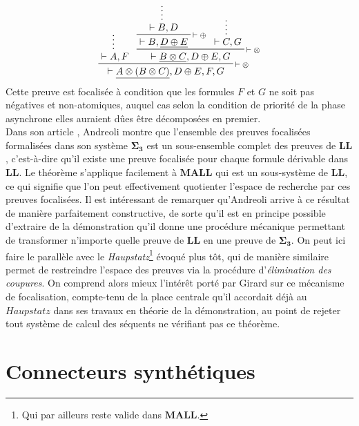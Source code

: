 \documentclass[11pt]{report}
\newcommand{\seq}{\vdash}
\newcommand{\irule}[1]{\footnotesize$#1$}
\newcommand{\iruleR}[1]{\irule{\seq{#1}}}
\begin{document}
\begin{displaymath}
	\prftree[r]{\iruleR{\otimes}}
		{\prfsummary{\seq A,F}}
		{\prftree[r]{\iruleR{\otimes}}
			{\prftree[r]{\iruleR{\oplus}}
				{\prfsummary{\seq B,D}}
				{\seq B,\underline{D \oplus E}}}
			{\prfsummary{\seq C,G}}
			{\seq \underline{B \otimes C},D \oplus E,G}}
	{\seq \underline{A \otimes (B \otimes C)},D \oplus E,F,G}
\end{displaymath}
Cette preuve est focalisée à condition que les formules $F$ et $G$ ne soit pas négatives et non-atomiques, auquel cas selon la condition de priorité de la phase asynchrone elles auraient dûes être décomposées en premier.\\

Dans son article \cite{And92}, Andreoli montre que l'ensemble des preuves focalisées formalisées dans son système $\bm{\Sigma_3}$ est un sous-ensemble complet des preuves de $\mathbf{LL}$, c'est-à-dire qu'il existe une preuve focalisée pour chaque formule dérivable dans $\mathbf{LL}$. Le théorème s'applique facilement à $\mathbf{MALL}$ qui est un sous-système de $\mathbf{LL}$, ce qui signifie que l'on peut effectivement quotienter l'espace de recherche par ces preuves focalisées. Il est intéressant de remarquer qu'Andreoli arrive à ce résultat de manière parfaitement constructive, de sorte qu'il est en principe possible d'extraire de la démonstration qu'il donne une procédure mécanique permettant de transformer n'importe quelle preuve de $\mathbf{LL}$ en une preuve de $\bm{\Sigma_3}$. On peut ici faire le parallèle avec le \textit{Haupstatz}\footnote{Qui par ailleurs reste valide dans $\mathbf{MALL}$.} évoqué plus tôt, qui de manière similaire permet de restreindre l'espace des preuves via la procédure d'\emph{élimination des coupures}. On comprend alors mieux l'intérêt porté par Girard sur ce mécanisme de focalisation, compte-tenu de la place centrale qu'il accordait déjà au $Haupstatz$ dans ses travaux en théorie de la démonstration, au point de rejeter tout système de calcul des séquents ne vérifiant pas ce théorème.

\section{Connecteurs synthétiques}
\end{document}
